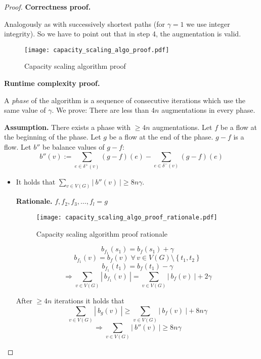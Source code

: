 \documentclass{article}
\newcommand{\card}[1]{\left|\:\!#1\:\!\right|}
\newcommand{\set}[1]{\left\{#1\right\}}
\newcommand{\fall}{\;\forall\,}
\begin{document}
\begin{proof}
  \textbf{Correctness proof.}

  Analogously as with successively shortest paths (for $\gamma = 1$ we use integer integrity).
  So we have to point out that in step 4, the augmentation is valid.

  \begin{figure}[h]
   \begin{center}
    \texttt{[image: capacity\_scaling\_algo\_proof.pdf]}
    \caption{Capacity scaling algorithm proof}
   \end{center}
  \end{figure}

  \textbf{Runtime complexity proof.}

  A \emph{phase} of the algorithm is a sequence of consecutive iterations which use the same value of $\gamma$. We prove: There are less than $4n$ augmentations in every phase.

  \textbf{Assumption.} There exists a phase with $\geq 4n$ augmentations. Let $f$ be a flow at the beginning of the phase. Let $g$ be a flow at the end of the phase.
  $g-f$ is a flow. Let $b''$ be balance values of $g-f$:
  \[
    b''(v) := \sum_{e \in \delta^+(v)} (g - f)(e) - \sum_{e \in \delta^-(v)} (g - f)(e)
  \]
  \clearpage
  \begin{itemize}
    \item It holds that $\sum_{v \in V(G)} \card{b''(v)} \geq 8n\gamma$.

      \textbf{Rationale.} $f, f_2, f_3, \ldots, f_l = g$

      \begin{figure}[h]
       \begin{center}
        \texttt{[image: capacity\_scaling\_algo\_proof\_rationale.pdf]}
        \caption{Capacity scaling algorithm proof rationale}
       \end{center}
      \end{figure}

      \[ b_{f_1}(s_1) = b_{f}(s_1) + \gamma \]
      \[ b_{f_1}(v) = b_{f}(v) \fall v \in V(G) \setminus \set{t_1, t_2} \]
      \[ b_{f_1}(t_1) = b_{f}(t_1) - \gamma \]
      \[ \Rightarrow \sum_{v \in V(G)} \card{b_{f_1}(v)} = \sum_{v \in V(G)} \card{b_f(v)} + 2 \gamma \]

      After $\geq 4n$ iterations it holds that
      \[
        \sum_{v \in V(G)} \card{b_g(v)} \geq \sum_{v \in V(G)} \card{b_f(v)} + 8n\gamma
      \] \[
        \Rightarrow \sum_{v \in V(G)} \card{b''(v)} \geq 8n\gamma
      \]


\end{itemize}
\end{proof}
\end{document}
